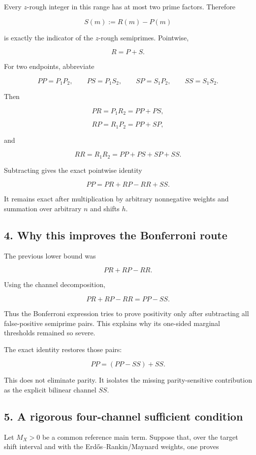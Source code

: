 Every \(z\)-rough integer in this range has at most two prime factors. Therefore

\[
S(m):=R(m)-P(m)
\]

is exactly the indicator of the \(z\)-rough semiprimes. Pointwise,

\[
R=P+S.
\tag{5}
\]

For two endpoints, abbreviate

\[
PP=P_1P_2,
\qquad
PS=P_1S_2,
\qquad
SP=S_1P_2,
\qquad
SS=S_1S_2.
\]

Then

\[
PR=P_1R_2=PP+PS,
\]

\[
RP=R_1P_2=PP+SP,
\]

and

\[
RR=R_1R_2=PP+PS+SP+SS.
\]

Subtracting gives the exact pointwise identity

\[
\boxed{
PP=PR+RP-RR+SS.
}
\tag{6}
\]

It remains exact after multiplication by arbitrary nonnegative weights and summation over arbitrary \(n\) and shifts \(h\).

\subsection*{4. Why this improves the Bonferroni route}

The previous lower bound was

\[
PR+RP-RR.
\]

Using the channel decomposition,

\[
PR+RP-RR=PP-SS.
\tag{7}
\]

Thus the Bonferroni expression tries to prove positivity only after subtracting all false-positive semiprime pairs. This explains why its one-sided marginal thresholds remained so severe.

The exact identity restores those pairs:

\[
PP=(PP-SS)+SS.
\]

This does not eliminate parity. It isolates the missing parity-sensitive contribution as the explicit bilinear channel \(SS\).

\subsection*{5. A rigorous four-channel sufficient condition}

Let \(M_X>0\) be a common reference main term. Suppose that, over the target shift interval and with the Erdős--Rankin/Maynard weights, one proves

